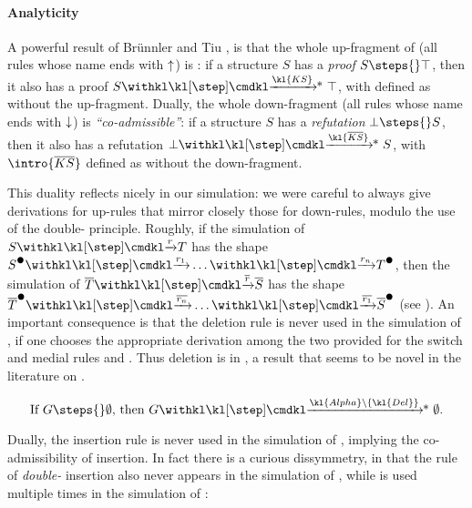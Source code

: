 \begin{scope}
\paragraph{Analyticity}

A powerful result of Brünnler and Tiu \cite{brunnler_local_2001}, is that the
whole up-fragment of  (all rules whose name ends with $\uparrow$) is
\emph{}: if a structure $S$ has a \emph{proof} $S \steps{} \top$, then
it also has a proof $S \xsteps{\kl{KS}} \top$, with  defined as
 without the up-fragment. Dually, the whole
down-fragment (all rules whose name ends with $\downarrow$) is
\emph{``co-admissible''}: if a structure $S$ has a \emph{refutation} $\bot
\steps{} S$, then it also has a refutation $\bot \xsteps{\kl{\dmdual{KS}}} S$,
with $\intro{\dmdual{KS}}$ defined as  without the down-fragment.

This duality reflects nicely in our simulation: we were careful to always give
derivations for up-rules that mirror closely those for down-rules, modulo the
use of the double- principle. Roughly, if the simulation of $S \xstep{r} T$
has the shape $\strans{S} \xstep{r_1} \ldots \xstep{r_n} \strans{T}$, then the
simulation of $\dmdual{T} \xstep{\dmdual{r}} \dmdual{S}$ has the shape
$\strans{\dmdual{T}} \xstep{\dmdual{r_n}} \ldots \xstep{\dmdual{r_1}}
\strans{\dmdual{S}}$ (see ). An important consequence is
that the deletion rule  is never used in the simulation of , if
one chooses the appropriate derivation among the two provided for the switch and
medial rules  and . Thus deletion is  in , a
result that seems to be novel in the literature on .

\begin{corollary}\label{cor:adm-era}
  $$
  \text{If $G \steps{} \emptyset$, then $G \xsteps{\kl{Alpha}\setminus\{\kl{Del}\}}
  \emptyset$.}
  $$
\end{corollary}

Dually, the insertion rule  is never used in the simulation of
, implying the co-admissibility of insertion. In fact there is
a curious dissymmetry, in that the rule  of \emph{double-}
insertion also never appears in the simulation of , while
 is used multiple times in the simulation of :


\end{scope}
